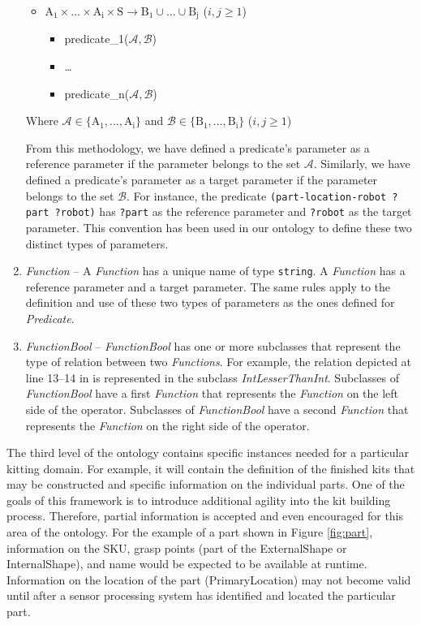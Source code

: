 \documentclass{llncs}
\newcommand{\class}[1] {\textit{#1}}
\newcommand{\stvar}[1] {\textsf{#1}}
\begin{document}
\begin{enumerate}
\begin{itemize}
 \item $\mathrm{A_1\times \dots\times A_i\times S\rightarrow B_1\cup\dots\cup B_j}$ ($i, j\geq 1$)
  \begin{itemize}
  \item \stvar{predicate\_1}($\mathcal{A,B}$)
  \item \ldots
  \item \stvar{predicate\_n}($\mathcal{A,B}$)
  \end{itemize}
\end{itemize}

Where $\mathcal{A} \in \mathrm{\{A_1,\ldots,A_i\}}$ and $\mathcal{B} \in \mathrm{\{B_1,\ldots,B_i\}}$ ($i, j\geq 1$)

From this methodology, we have defined a predicate's parameter as a reference parameter if the parameter belongs to the set $\mathcal{A}$. Similarly, we have defined a predicate's parameter as a target parameter if the parameter belongs to the set $\mathcal{B}$. For instance, the predicate \texttt{(part-location-robot ?part ?robot)} has \texttt{?part} as the reference parameter and \texttt{?robot} as the target parameter. This convention has been used in our ontology to define these two distinct types of parameters.

\item \class{Function} -- A \class{Function} has a unique name  of type \texttt{string}. A \class{Function} has a reference parameter and a target parameter. The same rules apply to the definition and use of these two types of parameters as the ones defined for \class{Predicate}.
\item \class{FunctionBool} -- \class{FunctionBool} has one or more subclasses that represent the type of relation between two \class{Functions}. For example, the relation depicted at line 13--14 in is represented in the subclass \class{IntLesserThanInt}. Subclasses of \class{FunctionBool} have a first \class{Function} that represents the \class{Function} on the left side of the operator. Subclasses of \class{FunctionBool} have a second \class{Function} that represents the \class{Function} on the right side of the operator.
\end{enumerate}

The third level of the ontology contains specific instances needed for a particular kitting domain. For example, it will contain the definition of the finished kits that may be
constructed and specific information on the individual parts. One of the goals of this framework is to introduce additional agility into the kit building process. Therefore,
partial information is accepted and even encouraged for this area of the ontology. For the example of a part shown in Figure \ref{fig:part}, information on the SKU, grasp points 
(part of the ExternalShape or InternalShape), and name would be expected to be available at runtime. Information on the location of the part (PrimaryLocation) may not
become valid until after a sensor processing system has identified and located the particular part.
\end{document}
